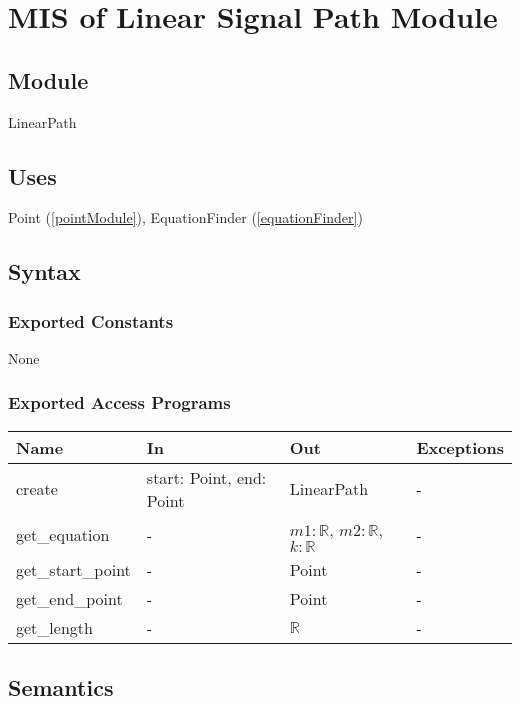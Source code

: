 \documentclass[12pt, titlepage]{article}
\begin{document}
\newpage
\section{MIS of Linear Signal Path Module} \label{linearPathModule}

\subsection{Module}

LinearPath

\subsection{Uses}

Point (\autoref{pointModule}), EquationFinder (\autoref{equationFinder}) 

\subsection{Syntax}

\subsubsection{Exported Constants} None

\subsubsection{Exported Access Programs}

\begin{center}
\begin{tabular}{p{4cm} p{2.3cm} p{3cm} p{2cm}}
\hline
\textbf{Name} & \textbf{In} & \textbf{Out} & \textbf{Exceptions} \\
\hline
create & start: Point, end: Point & LinearPath & - \\
get\_equation & - & $m1: \mathbb{R}$, $m2: \mathbb{R}$, $k: \mathbb{R}$ & - \\
get\_start\_point & - & Point & - \\
get\_end\_point & - & Point & - \\
get\_length & - & $\mathbb{R}$ & - \\
\hline
\end{tabular}
\end{center}

\subsection{Semantics}
\end{document}
